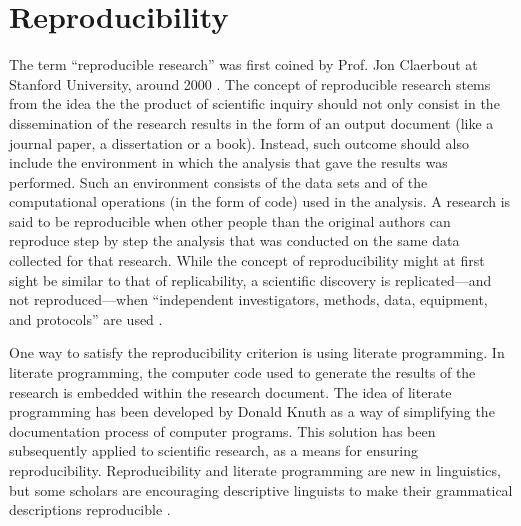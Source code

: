 \documentclass[11pt,a4paper,oneside,openany]{memoir}\usepackage[]{graphicx}\usepackage[]{color}
\begin{document}
\section{Reproducibility}
The term ``reproducible research'' was first coined by Prof. Jon Claerbout at Stanford University, around 2000 \citep{fomel2009}.
The concept of reproducible research stems from the idea the the product of scientific inquiry should not only consist in the dissemination of the research results in the form of an output document (like a journal paper, a dissertation or a book).
Instead, such outcome should also include the environment in which the analysis that gave the results was performed.
Such an environment consists of the data sets and of the computational operations (in the form of code) used in the analysis.
A research is said to be reproducible when other people than the original authors can reproduce step by step the analysis that was conducted on the same data collected for that research.
While the concept of reproducibility might at first sight be similar to that of replicability, a scientific discovery is replicated---and not reproduced---when ``independent investigators, methods, data, equipment, and protocols'' are used \citep{peng2009}.

One way to satisfy the reproducibility criterion is using literate programming.
In literate programming, the computer code used to generate the results of the research is embedded within the research document.
The idea of literate programming has been developed by Donald Knuth \citep{knuth1984} as a way of simplifying the documentation process of computer programs.
This solution has been subsequently applied to scientific research, as a means for ensuring reproducibility.
Reproducibility and literate programming are new in linguistics, but some scholars are encouraging descriptive linguists to make their grammatical descriptions reproducible \citep{maxwell2005,maxwell2013}.
\end{document}

